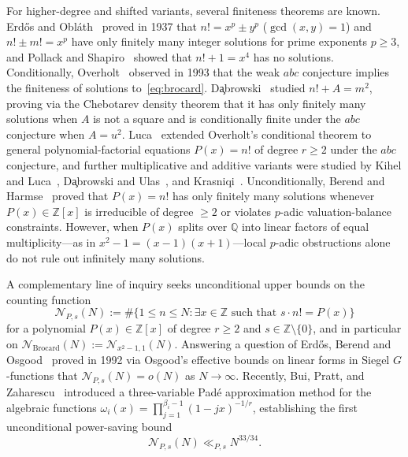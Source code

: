 \documentclass[11pt,reqno]{amsart}
\theoremstyle{remark}
\newcommand{\Z}{\mathbb{Z}}
\newcommand{\Q}{\mathbb{Q}}
\begin{document}
For higher-degree and shifted variants, several finiteness theorems are known. Erd\H{o}s and Obl\'ath~\cite{ErdosOblath1937} proved in 1937 that $n! = x^p \pm y^p$ ($\gcd(x, y) = 1$) and $n! \pm m! = x^p$ have only finitely many integer solutions for prime exponents $p \ge 3$, and Pollack and Shapiro~\cite{PollackShapiro1973} showed that $n! + 1 = x^4$ has no solutions. Conditionally, Overholt~\cite{Overholt1993} observed in 1993 that the weak $abc$ conjecture implies the finiteness of solutions to~\eqref{eq:brocard}. D\c{a}browski~\cite{Dabrowski1996} studied $n! + A = m^2$, proving via the Chebotarev density theorem that it has only finitely many solutions when $A$ is not a square and is conditionally finite under the $abc$ conjecture when $A = u^2$. Luca~\cite{Luca2002} extended Overholt's conditional theorem to general polynomial-factorial equations $P(x) = n!$ of degree $r \ge 2$ under the $abc$ conjecture, and further multiplicative and additive variants were studied by Kihel and Luca~\cite{KihelLuca2008}, D\c{a}browski and Ulas~\cite{DabrowskiUlas2013}, and Krasniqi~\cite{Krasniqi2026}. Unconditionally, Berend and Harmse~\cite{BerendHarmse2006} proved that $P(x) = n!$ has only finitely many solutions whenever $P(x) \in \Z[x]$ is irreducible of degree $\ge 2$ or violates $p$-adic valuation-balance constraints. However, when $P(x)$ splits over $\Q$ into linear factors of equal multiplicity---as in $x^2 - 1 = (x - 1)(x + 1)$---local $p$-adic obstructions alone do not rule out infinitely many solutions.

A complementary line of inquiry seeks unconditional upper bounds on the counting function
\begin{equation}\label{eq:counting}
\mathcal{N}_{P,s}(N) := \#\{1 \le n \le N : \exists x \in \Z \text{ such that } s \cdot n! = P(x)\}
\end{equation}
for a polynomial $P(x) \in \Z[x]$ of degree $r \ge 2$ and $s \in \Z \setminus \{0\}$, and in particular on $\mathcal{N}_{\mathrm{Brocard}}(N) := \mathcal{N}_{x^2-1, 1}(N)$. Answering a question of Erd\H{o}s, Berend and Osgood~\cite{BerendOsgood1992} proved in 1992 via Osgood's effective bounds on linear forms in Siegel $G$-functions that $\mathcal{N}_{P,s}(N) = o(N)$ as $N \to \infty$. Recently, Bui, Pratt, and Zaharescu~\cite{BPZ2023} introduced a three-variable Pad\'e approximation method for the algebraic functions $\omega_i(x) = \prod_{j=1}^{\beta_i-1}(1 - jx)^{-1/r}$, establishing the first unconditional power-saving bound
\begin{equation}\label{eq:bpz}
\mathcal{N}_{P,s}(N) \ll_{P,s} N^{33/34}.
\end{equation}
\end{document}
